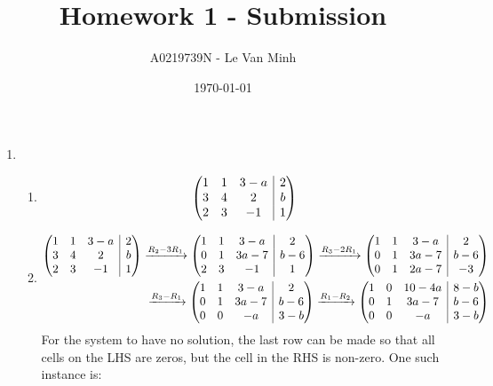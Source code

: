 \documentclass{article}
\title{Homework 1 - Submission}
\author{A0219739N - Le Van Minh}
\date{\today}
\makeatletter
\newenvironment{amatrix}[1]{%
  \left(\begin{array}{@{}*{#1}{c}|c@{}}
}{%
  \end{array}\right)
}
\newcommand{\ro}[1]{%
  \xrightarrow{\mathmakebox{#1}}%
}
\makeatother
\begin{document}
\maketitle
\begin{enumerate}
  \item \begin{enumerate}[label={(\roman*)}]
    \item 
      \[
        \begin{amatrix}{3}
            1 & 1 & 3 - a & 2 \\
            3 & 4 & 2 & b \\
            2 & 3 & -1 & 1
        \end{amatrix}
      \]
    \item
      \begin{alignat*}{2}
        \begin{amatrix}{3}
            1 & 1 & 3 - a & 2 \\
            3 & 4 & 2 & b \\
            2 & 3 & -1 & 1
        \end{amatrix}
        \ro{R_2 - 3R_1}
        \begin{amatrix}{3}
            1 & 1 & 3 - a & 2 \\
            0 & 1 & 3a-7 & b-6 \\
            2 & 3 & -1 & 1
        \end{amatrix}
        \ro{R_3 - 2R_1}
        \begin{amatrix}{3}
            1 & 1 & 3 - a & 2 \\
            0 & 1 & 3a-7 & b-6 \\
            0 & 1 & 2a - 7 & -3
        \end{amatrix}
        \\
        \ro{R_3 - R_1}
        \begin{amatrix}{3}
            1 & 1 & 3 - a & 2 \\
            0 & 1 & 3a-7 & b-6 \\
            0 & 0 & -a & 3 - b
        \end{amatrix}
        \ro{R_1 - R_2}
        \begin{amatrix}{3}
            1 & 0 & 10 - 4a & 8 - b \\
            0 & 1 & 3a-7 & b-6 \\
            0 & 0 & -a & 3 - b
        \end{amatrix}
      \end{alignat*}
      For the system to have no solution, the last row can be made so that all cells on the LHS are zeros, but the cell in the RHS is non-zero. One such instance is:

\end{enumerate}
\end{enumerate}
\end{document}
